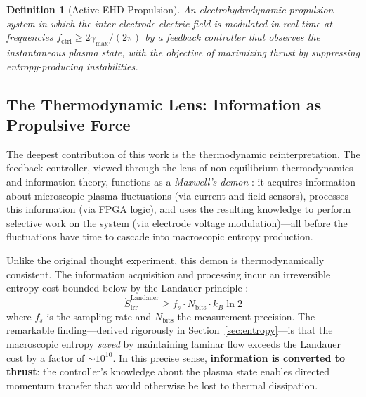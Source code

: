 \documentclass[12pt,twocolumn]{article}
\newtheorem{definition}{Definition}
\newcommand{\Sdot}{\dot{S}_{\mathrm{irr}}}
\begin{document}
\begin{definition}[Active EHD Propulsion]
\label{def:active_ehd}
An electrohydrodynamic propulsion system in which the inter-electrode
electric field is modulated in real time at frequencies $f_{\mathrm{ctrl}}
\geq 2\gamma_{\max}/(2\pi)$ by a feedback controller that observes
the instantaneous plasma state, with the objective of maximizing
thrust by suppressing entropy-producing instabilities.
\end{definition}

\subsection{The Thermodynamic Lens: Information as Propulsive Force}
\label{sec:intro:thermo}

The deepest contribution of this work is the thermodynamic
reinterpretation. The feedback controller, viewed through the lens
of non-equilibrium thermodynamics and information theory, functions
as a \emph{Maxwell's demon} \cite{Maxwell1871, Leff2002}:
it acquires information about microscopic plasma fluctuations
(via current and field sensors), processes this information
(via FPGA logic), and uses the resulting knowledge to perform
selective work on the system (via electrode voltage modulation)---all
before the fluctuations have time to cascade into macroscopic entropy
production.

Unlike the original thought experiment, this demon is
thermodynamically consistent. The information acquisition and
processing incur an irreversible entropy cost bounded below by the
Landauer principle \cite{Landauer1961, Bennett2003}:
\begin{equation}
  \Sdot^{\mathrm{Landauer}}
  \geq f_s \cdot N_{\mathrm{bits}} \cdot k_B \ln 2
  \label{eq:intro:landauer}
\end{equation}
where $f_s$ is the sampling rate and $N_{\mathrm{bits}}$ the
measurement precision. The remarkable finding---derived rigorously
in Section~\ref{sec:entropy}---is that the macroscopic entropy
\emph{saved} by maintaining laminar flow exceeds the Landauer cost
by a factor of $\sim 10^{10}$. In this precise sense,
\textbf{information is converted to thrust}: the controller's
knowledge about the plasma state enables directed momentum transfer
that would otherwise be lost to thermal dissipation.

\end{document}
